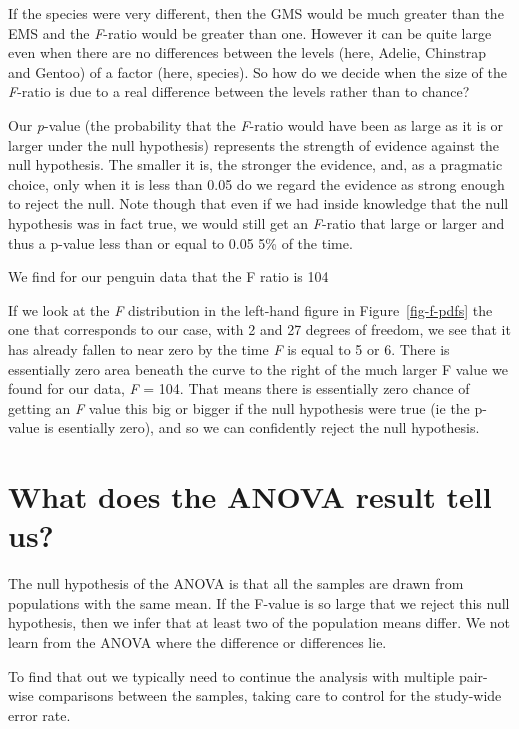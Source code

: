 \documentclass[
  letterpaper,
  DIV=11,
  numbers=noendperiod]{scrreprt}
\begin{document}
If the species were very different, then the GMS would be much greater
than the EMS and the \emph{F}-ratio would be greater than one. However
it can be quite large even when there are no differences between the
levels (here, Adelie, Chinstrap and Gentoo) of a factor (here, species).
So how do we decide when the size of the \emph{F}-ratio is due to a real
difference between the levels rather than to chance?

Our \emph{p}-value (the probability that the \emph{F}-ratio would have
been as large as it is or larger under the null hypothesis) represents
the strength of evidence against the null hypothesis. The smaller it is,
the stronger the evidence, and, as a pragmatic choice, only when it is
less than 0.05 do we regard the evidence as strong enough to reject the
null. Note though that even if we had inside knowledge that the null
hypothesis was in fact true, we would still get an \emph{F}-ratio that
large or larger and thus a p-value less than or equal to 0.05 5\% of the
time.

We find for our penguin data that the F ratio is 104

If we look at the \emph{F} distribution in the left-hand figure in
Figure~\ref{fig-f-pdfs} the one that corresponds to our case, with 2 and
27 degrees of freedom, we see that it has already fallen to near zero by
the time \emph{F} is equal to 5 or 6. There is essentially zero area
beneath the curve to the right of the much larger F value we found for
our data, \emph{F} = 104. That means there is essentially zero chance of
getting an \emph{F} value this big or bigger if the null hypothesis were
true (ie the p-value is esentially zero), and so we can confidently
reject the null hypothesis.

\section{What does the ANOVA result tell
us?}\label{what-does-the-anova-result-tell-us}

The null hypothesis of the ANOVA is that all the samples are drawn from
populations with the same mean. If the F-value is so large that we
reject this null hypothesis, then we infer that at least two of the
population means differ. We not learn from the ANOVA where the
difference or differences lie.

To find that out we typically need to continue the analysis with
multiple pair-wise comparisons between the samples, taking care to
control for the study-wide error rate.
\end{document}
